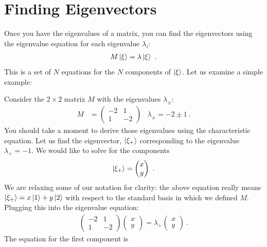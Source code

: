 \documentclass[12pt, oneside]{report}    %
\let\oldsection\section
\def\section{%
  \setcounter{sidenote}{1}%
  \oldsection
}
\begin{document}
\section{Finding Eigenvectors}

Once you have the eigenvalues of a matrix, you can find the eigenvectors using the eigenvalue equation for each eigenvalue $\lambda_i$:
\begin{align}
    M\left|\xi\right\rangle = \lambda \left|\xi\right\rangle \ .
\end{align}
This is a set of $N$ equations for the $N$ components of $\left|\xi\right\rangle$. Let us examine a simple example:
\begin{example}
Consider the $2\times 2$ matrix $M$ with the eigenvalues $\lambda_\pm$:
\begin{align}
    M &=
    \begin{pmatrix}
        -2 & 1\\
        1 & -2
    \end{pmatrix}
    &
    \lambda_\pm = -2 \pm 1 \ .
\end{align}
You should take a moment to derive those eigenvalues using the characteristic equation. Let us find the eigenvector, $\left|\xi_+\right\rangle$ corresponding to the eigenvalue $\lambda_+ = -1$. We would like to solve for the components
\begin{align}
    \left|\xi_+\right\rangle
    =
    \begin{pmatrix}
        x\\y
    \end{pmatrix} \ .
\end{align}
We are relaxing some of our notation for clarity: the above equation really means $\left|\xi_+\right\rangle=x\left|1\right\rangle + y\left|2\right\rangle$ with respect to the standard basis in which we defined $M$. Plugging this into the eigenvalue equation:
\begin{align}
   \begin{pmatrix}
        -2 & 1\\
        1 & -2
    \end{pmatrix}
    \begin{pmatrix}
        x\\y
    \end{pmatrix}
    = 
    \lambda_+
    \begin{pmatrix}
        x\\y
    \end{pmatrix} \ .
    \label{eq:ex:eigenvector:finding:1}
\end{align}
The equation for the first component is
\begin{align}

\end{align}
\end{example}
\end{document}

